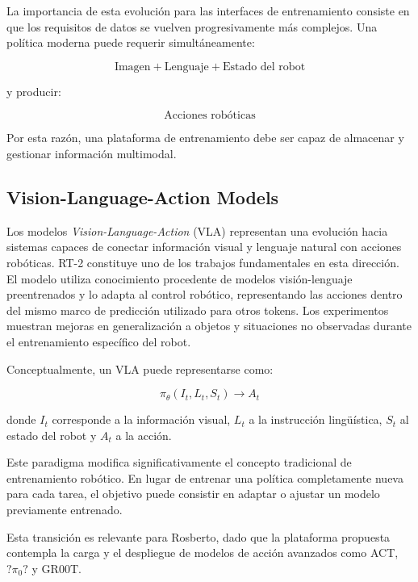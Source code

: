 \documentclass[stu,12pt,floatsintext]{apa7}
\begin{document}
La importancia de esta evolución para las interfaces de entrenamiento consiste en que los requisitos de datos se vuelven progresivamente más complejos. Una política moderna puede requerir simultáneamente:

\begin{equation}
\text{Imagen} + \text{Lenguaje} + \text{Estado del robot}
\end{equation}

y producir:

\begin{equation}
\text{Acciones robóticas}
\end{equation}

Por esta razón, una plataforma de entrenamiento debe ser capaz de almacenar y gestionar información multimodal.

\subsection{Vision-Language-Action Models}

Los modelos \textit{Vision-Language-Action} (VLA) representan una evolución hacia sistemas capaces de conectar información visual y lenguaje natural con acciones robóticas. RT-2 constituye uno de los trabajos fundamentales en esta dirección. El modelo utiliza conocimiento procedente de modelos visión-lenguaje preentrenados y lo adapta al control robótico, representando las acciones dentro del mismo marco de predicción utilizado para otros tokens. Los experimentos muestran mejoras en generalización a objetos y situaciones no observadas durante el entrenamiento específico del robot.

Conceptualmente, un VLA puede representarse como:

\begin{equation}
\pi_{\theta}(I_t,L_t,S_t) \rightarrow A_t
\end{equation}

donde $I_t$ corresponde a la información visual, $L_t$ a la instrucción lingüística, $S_t$ al estado del robot y $A_t$ a la acción.

Este paradigma modifica significativamente el concepto tradicional de entrenamiento robótico. En lugar de entrenar una política completamente nueva para cada tarea, el objetivo puede consistir en adaptar o ajustar un modelo previamente entrenado.

Esta transición es relevante para Rosberto, dado que la plataforma propuesta contempla la carga y el despliegue de modelos de acción avanzados como ACT, $?\pi_0?$ y GR00T.
\end{document}
